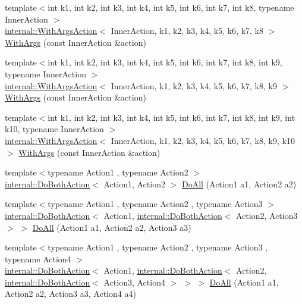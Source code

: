 \begin{DoxyCompactItemize}
\item 
{\footnotesize template$<$int k1, int k2, int k3, int k4, int k5, int k6, int k7, int k8, typename Inner\+Action $>$ }\\\mbox{\hyperlink{classtesting_1_1internal_1_1WithArgsAction}{internal\+::\+With\+Args\+Action}}$<$ Inner\+Action, k1, k2, k3, k4, k5, k6, k7, k8 $>$ \mbox{\hyperlink{namespacetesting_a16c131c0d58ae07d2e1ee6c7a44aaad1}{With\+Args}} (const Inner\+Action \&action)
\item 
{\footnotesize template$<$int k1, int k2, int k3, int k4, int k5, int k6, int k7, int k8, int k9, typename Inner\+Action $>$ }\\\mbox{\hyperlink{classtesting_1_1internal_1_1WithArgsAction}{internal\+::\+With\+Args\+Action}}$<$ Inner\+Action, k1, k2, k3, k4, k5, k6, k7, k8, k9 $>$ \mbox{\hyperlink{namespacetesting_a6aec78e6c201b150c78271e3f851414e}{With\+Args}} (const Inner\+Action \&action)
\item 
{\footnotesize template$<$int k1, int k2, int k3, int k4, int k5, int k6, int k7, int k8, int k9, int k10, typename Inner\+Action $>$ }\\\mbox{\hyperlink{classtesting_1_1internal_1_1WithArgsAction}{internal\+::\+With\+Args\+Action}}$<$ Inner\+Action, k1, k2, k3, k4, k5, k6, k7, k8, k9, k10 $>$ \mbox{\hyperlink{namespacetesting_a768a620ad07c6b5822201fa4f15fb4f0}{With\+Args}} (const Inner\+Action \&action)
\item 
{\footnotesize template$<$typename Action1 , typename Action2 $>$ }\\\mbox{\hyperlink{classtesting_1_1internal_1_1DoBothAction}{internal\+::\+Do\+Both\+Action}}$<$ Action1, Action2 $>$ \mbox{\hyperlink{namespacetesting_a5f533932753d2af95000e96c4a3042e3}{Do\+All}} (Action1 a1, Action2 a2)
\item 
{\footnotesize template$<$typename Action1 , typename Action2 , typename Action3 $>$ }\\\mbox{\hyperlink{classtesting_1_1internal_1_1DoBothAction}{internal\+::\+Do\+Both\+Action}}$<$ Action1, \mbox{\hyperlink{classtesting_1_1internal_1_1DoBothAction}{internal\+::\+Do\+Both\+Action}}$<$ Action2, Action3 $>$ $>$ \mbox{\hyperlink{namespacetesting_ad6a3ce5e229120ea287286a86394d712}{Do\+All}} (Action1 a1, Action2 a2, Action3 a3)
\item 
{\footnotesize template$<$typename Action1 , typename Action2 , typename Action3 , typename Action4 $>$ }\\\mbox{\hyperlink{classtesting_1_1internal_1_1DoBothAction}{internal\+::\+Do\+Both\+Action}}$<$ Action1, \mbox{\hyperlink{classtesting_1_1internal_1_1DoBothAction}{internal\+::\+Do\+Both\+Action}}$<$ Action2, \mbox{\hyperlink{classtesting_1_1internal_1_1DoBothAction}{internal\+::\+Do\+Both\+Action}}$<$ Action3, Action4 $>$ $>$ $>$ \mbox{\hyperlink{namespacetesting_a790ce08c80a1f8ececa0f2a4f678247c}{Do\+All}} (Action1 a1, Action2 a2, Action3 a3, Action4 a4)

\end{DoxyCompactItemize}
